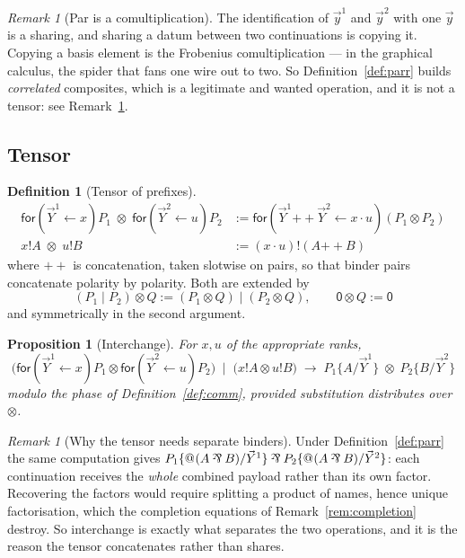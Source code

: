 \documentclass[11pt]{article}
\makeatletter
\newtheorem{proposition}[theorem]{Proposition}
\theoremstyle{definition}
\newtheorem{definition}[theorem]{Definition}
\theoremstyle{remark}
\newtheorem{remark}[theorem]{Remark}
\newcommand{\pzero}{\mathsf{0}}
\newcommand{\quo}[1]{\ensuremath{@_{#1}}}
\newcommand{\red}{\ensuremath{\rightarrow}}
\newcommand{\parr}{\mathbin{\rotatebox[origin=c]{180}{\&}}}
\makeatother
\begin{document}
\begin{remark}[Par is a comultiplication]
\label{rem:parrcomult}
The identification of $\vec{y}^{1}$ and $\vec{y}^{2}$ with one $\vec{y}$ is a
sharing, and sharing a datum between two continuations is copying it. Copying a
basis element is the Frobenius comultiplication --- in the graphical calculus,
the spider that fans one wire out to two. So Definition~\ref{def:parr} builds
\emph{correlated} composites, which is a legitimate and wanted operation, and it
is not a tensor: see Remark~\ref{rem:interchange}.
\end{remark}

\subsection{Tensor}

\begin{definition}[Tensor of prefixes]
\label{def:tensor}
\begin{align*}
  \mathsf{for}(\vec{Y}^{1} \leftarrow x)P_1 \;\otimes\;
  \mathsf{for}(\vec{Y}^{2} \leftarrow u)P_2
  &:= \mathsf{for}(\vec{Y}^{1} \mathbin{+\!\!+} \vec{Y}^{2}
      \leftarrow x \cdot u)(P_1 \otimes P_2) \\
  x!A \;\otimes\; u!B &:= (x \cdot u)!(A \mathbin{+\!\!+} B)
\end{align*}
where $\mathbin{+\!\!+}$ is concatenation, taken slotwise on pairs, so that
binder pairs concatenate polarity by polarity. Both are
extended by
\[
  (P_1 \mid P_2) \otimes Q := (P_1 \otimes Q) \mid (P_2 \otimes Q),
  \qquad
  \pzero \otimes Q := \pzero
\]
and symmetrically in the second argument.
\end{definition}

\begin{proposition}[Interchange]
\label{prop:interchange}
For $x, u$ of the appropriate ranks,
\[
  \bigl(\mathsf{for}(\vec{Y}^{1} \leftarrow x)P_1 \otimes
        \mathsf{for}(\vec{Y}^{2} \leftarrow u)P_2\bigr)
  \;\mid\;
  \bigl(x!A \otimes u!B\bigr)
  \;\red\;
  P_1\{A/\vec{Y}^{1}\} \;\otimes\; P_2\{B/\vec{Y}^{2}\}
\]
modulo the phase of Definition~\ref{def:comm}, \emph{provided} substitution
distributes over $\otimes$.
\end{proposition}

\begin{remark}[Why the tensor needs separate binders]
\label{rem:interchange}
Under Definition~\ref{def:parr} the same computation gives
$P_1\{\quo{}(A \parr B)/\vec{Y}^{1}\} \parr P_2\{\quo{}(A \parr B)/\vec{Y}^{2}\}$:
each continuation receives the \emph{whole} combined payload rather than its own
factor. Recovering the factors would require splitting a product of names, hence
unique factorisation, which the completion equations of
Remark~\ref{rem:completion} destroy. So interchange is exactly what separates the
two operations, and it is the reason the tensor concatenates rather than shares.
\end{remark}
\end{document}
